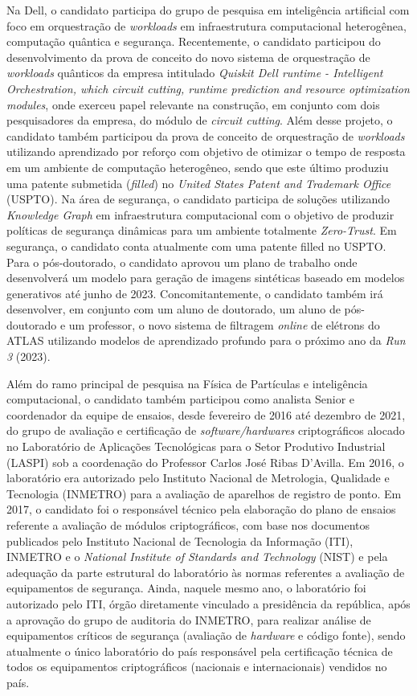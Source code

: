 Na Dell, o candidato participa do grupo de pesquisa em inteligência artificial com foco em orquestração 
de \emph{workloads} em infraestrutura computacional heterogênea, computação quântica e segurança. 
Recentemente, o candidato participou do desenvolvimento da prova de conceito do novo sistema de 
orquestração de \emph{workloads} quânticos da empresa intitulado \emph{Quiskit Dell runtime - Intelligent 
Orchestration, which circuit cutting, runtime prediction and resource optimization modules}, onde 
exerceu papel relevante na construção, em conjunto com dois pesquisadores da empresa, do módulo de 
\emph{circuit cutting}. Além desse projeto, o candidato também participou da prova de conceito de orquestração 
de \emph{workloads} utilizando aprendizado por reforço com objetivo de otimizar o tempo de resposta em um 
ambiente de computação heterogêneo, sendo que este último produziu uma patente submetida (\emph{filled}) no 
\emph{United States Patent and Trademark Office} (USPTO). Na área de segurança, o candidato participa de soluções 
utilizando \emph{Knowledge Graph} em infraestrutura computacional com o objetivo de produzir políticas de segurança 
dinâmicas para um ambiente totalmente \emph{Zero-Trust}. Em segurança, o candidato conta atualmente com uma patente 
filled no USPTO. Para o pós-doutorado, o candidato aprovou um plano de trabalho onde desenvolverá um modelo 
para geração de imagens sintéticas baseado em modelos generativos até junho de 2023. Concomitantemente, o 
candidato também irá desenvolver, em conjunto com um aluno de doutorado, um aluno de pós-doutorado e um 
professor, o novo sistema de filtragem \emph{online} de elétrons do ATLAS utilizando modelos de aprendizado profundo 
para o próximo ano da \emph{Run 3} (2023). 




Além do ramo principal de pesquisa na Física de Partículas e inteligência computacional, o candidato 
também participou como analista Senior e coordenador da equipe de ensaios, desde fevereiro de 
2016 até dezembro de 2021, do grupo de avaliação e certificação 
de \emph{software/hardwares} criptográficos alocado no Laboratório de Aplicações Tecnológicas para 
o Setor Produtivo Industrial (LASPI) sob a coordenação do Professor Carlos José Ribas D'Avilla. 
Em 2016, o laboratório era autorizado pelo Instituto Nacional de Metrologia, Qualidade e Tecnologia (INMETRO) 
para a avaliação de aparelhos de registro de ponto. 
Em 2017, o candidato foi o responsável técnico pela elaboração do plano de ensaios referente a avaliação 
de módulos criptográficos, com base nos documentos publicados pelo Instituto Nacional de Tecnologia 
da Informação (ITI), INMETRO e o \emph{National Institute of Standards and Technology} (NIST) e pela adequação 
da parte estrutural do laboratório às normas referentes a avaliação de equipamentos de segurança. 
Ainda, naquele mesmo ano, o laboratório foi autorizado pelo ITI, órgão diretamente vinculado a presidência 
da república, após a aprovação do grupo de auditoria do INMETRO, para realizar análise de equipamentos críticos 
de segurança (avaliação de \emph{hardware} e código fonte), sendo atualmente o único laboratório do país 
responsável pela certificação técnica de todos os equipamentos criptográficos (nacionais e internacionais) 
vendidos no país. 

